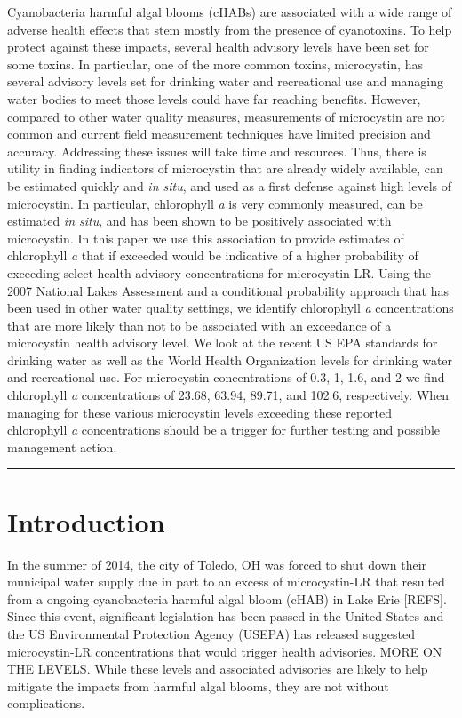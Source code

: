 \documentclass[11pt,]{article}
\begin{document}
Cyanobacteria harmful algal blooms (cHABs) are associated with a wide
range of adverse health effects that stem mostly from the presence of
cyanotoxins. To help protect against these impacts, several health
advisory levels have been set for some toxins. In particular, one of the
more common toxins, microcystin, has several advisory levels set for
drinking water and recreational use and managing water bodies to meet
those levels could have far reaching benefits. However, compared to
other water quality measures, measurements of microcystin are not common
and current field measurement techniques have limited precision and
accuracy. Addressing these issues will take time and resources. Thus,
there is utility in finding indicators of microcystin that are already
widely available, can be estimated quickly and \emph{in situ}, and used
as a first defense against high levels of microcystin. In particular,
chlorophyll \emph{a} is very commonly measured, can be estimated
\emph{in situ}, and has been shown to be positively associated with
microcystin. In this paper we use this association to provide estimates
of chlorophyll \emph{a} that if exceeded would be indicative of a higher
probability of exceeding select health advisory concentrations for
microcystin-LR. Using the 2007 National Lakes Assessment and a
conditional probability approach that has been used in other water
quality settings, we identify chlorophyll \emph{a} concentrations that
are more likely than not to be associated with an exceedance of a
microcystin health advisory level. We look at the recent US EPA
standards for drinking water as well as the World Health Organization
levels for drinking water and recreational use. For microcystin
concentrations of 0.3, 1, 1.6, and 2 we find chlorophyll \emph{a}
concentrations of 23.68, 63.94, 89.71, and 102.6, respectively. When
managing for these various microcystin levels exceeding these reported
chlorophyll \emph{a} concentrations should be a trigger for further
testing and possible management action.

\vspace{3mm}

\hrule

\doublespace

\section{Introduction}\label{introduction}

In the summer of 2014, the city of Toledo, OH was forced to shut down
their municipal water supply due in part to an excess of microcystin-LR
that resulted from a ongoing cyanobacteria harmful algal bloom (cHAB) in
Lake Erie {[}REFS{]}. Since this event, significant legislation has been
passed in the United States and the US Environmental Protection Agency
(USEPA) has released suggested microcystin-LR concentrations that would
trigger health advisories. MORE ON THE LEVELS. While these levels and
associated advisories are likely to help mitigate the impacts from
harmful algal blooms, they are not without complications.
\end{document}
